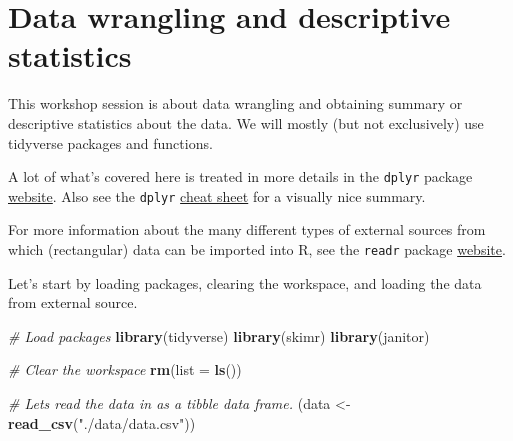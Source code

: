 \documentclass[
]{book}
\newenvironment{Shaded}{\begin{snugshade}}{\end{snugshade}}
\newcommand{\AttributeTok}[1]{\textcolor[rgb]{0.13,0.29,0.53}{#1}}
\newcommand{\CommentTok}[1]{\textcolor[rgb]{0.56,0.35,0.01}{\textit{#1}}}
\newcommand{\FunctionTok}[1]{\textcolor[rgb]{0.13,0.29,0.53}{\textbf{#1}}}
\newcommand{\NormalTok}[1]{#1}
\newcommand{\OtherTok}[1]{\textcolor[rgb]{0.56,0.35,0.01}{#1}}
\newcommand{\StringTok}[1]{\textcolor[rgb]{0.31,0.60,0.02}{#1}}
\begin{document}
\hypertarget{wrangling}{%
\chapter{Data wrangling and descriptive statistics}\label{wrangling}}

This workshop session is about data wrangling and obtaining summary or descriptive statistics about the data. We will mostly (but not exclusively) use tidyverse packages and functions.

A lot of what's covered here is treated in more details in the \texttt{dplyr} package \href{https://dplyr.tidyverse.org/}{website}. Also see the \texttt{dplyr} \href{https://github.com/rstudio/cheatsheets/blob/main/data-transformation.pdf}{cheat sheet} for a visually nice summary.

For more information about the many different types of external sources from which (rectangular) data can be imported into R, see the \texttt{readr} package \href{https://readr.tidyverse.org/}{website}.

Let's start by loading packages, clearing the workspace, and loading the data from external source.

\begin{Shaded}
\begin{Highlighting}[]
\CommentTok{\# Load packages}
\FunctionTok{library}\NormalTok{(tidyverse)}
\FunctionTok{library}\NormalTok{(skimr)}
\FunctionTok{library}\NormalTok{(janitor)}

\CommentTok{\# Clear the workspace}
\FunctionTok{rm}\NormalTok{(}\AttributeTok{list =} \FunctionTok{ls}\NormalTok{())}

\CommentTok{\# Let\textquotesingle{}s read the data in as a tibble data frame.}
\NormalTok{(data }\OtherTok{\textless{}{-}} \FunctionTok{read\_csv}\NormalTok{(}\StringTok{"./data/data.csv"}\NormalTok{))}
\end{Highlighting}
\end{Shaded}
\end{document}

